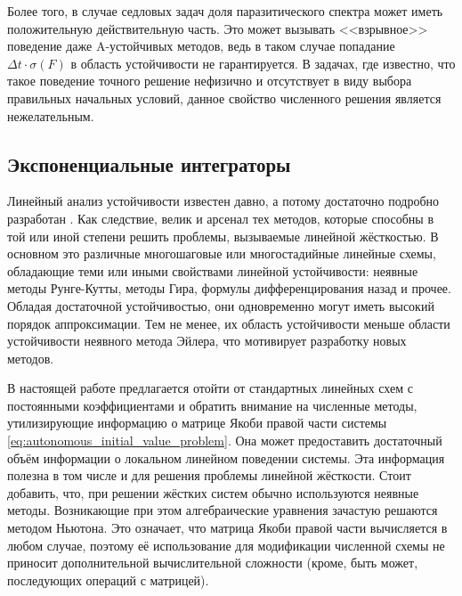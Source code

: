 Более того, в случае седловых задач доля паразитического спектра может иметь положительную действительную часть.
Это может вызывать <<взрывное>> поведение даже A-устойчивых методов,
ведь в таком случае попадание $ \Delta t \cdot \sigma(F) $ в область устойчивости не гарантируется.
В задачах, где известно, что такое поведение точного решение нефизично и отсутствует в виду выбора правильных начальных условий,
данное свойство численного решения является нежелательным.


\subsection{Экспоненциальные интеграторы}
\label{subsec:exponential_integrators}

Линейный анализ устойчивости известен давно, а потому достаточно подробно разработан
\cite{auzinger1993modern, dahlquist1963special, dahlquist1975stability, liu2019study, heirer1999solvingode2, lambert1991methods}.
Как следствие, велик и арсенал тех методов, которые способны в той или иной степени решить проблемы, вызываемые линейной жёсткостью.
В основном это различные многошаговые или многостадийные линейные схемы, обладающие теми или иными свойствами линейной устойчивости:
неявные методы Рунге-Кутты, методы Гира, формулы дифференцирования назад и прочее.
Обладая достаточной устойчивостью, они одновременно могут иметь высокий порядок аппроксимации.
Тем не менее, их область устойчивости меньше области устойчивости неявного метода Эйлера,
что мотивирует разработку новых методов.

В настоящей работе предлагается отойти от стандартных линейных схем с постоянными коэффициентами и обратить внимание на численные методы,
утилизирующие информацию о матрице Якоби правой части системы \eqref{eq:autonomous_initial_value_problem}.
Она может предоставить достаточный объём информации о локальном линейном поведении системы.
Эта информация полезна в том числе и для решения проблемы линейной жёсткости.
Стоит добавить, что, при решении жёстких систем обычно используются неявные методы.
Возникающие при этом алгебраические уравнения зачастую решаются методом Ньютона.
Это означает, что матрица Якоби правой части вычисляется в любом случае,
поэтому её использование для модификации численной схемы не приносит дополнительной вычислительной сложности
(кроме, быть может, последующих операций с матрицей).

